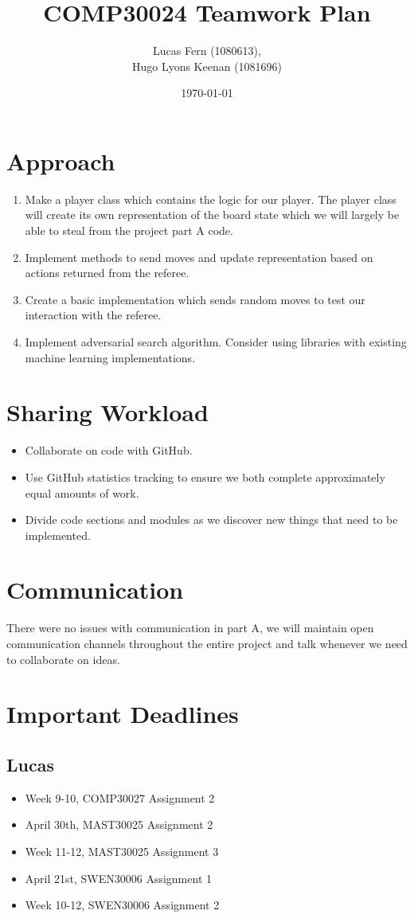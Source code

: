 \documentclass{article}
\title{COMP30024 Teamwork Plan}
\date{\today}
\author{Lucas Fern (1080613),\\Hugo Lyons Keenan (1081696)}
\begin{document}
\maketitle
\section{Approach}
\begin{enumerate}
    \item Make a player class which contains the logic for our player. The player class will create its own representation of the board state which we will largely be able to steal from the project part A code.
    \item Implement methods to send moves and update representation based on actions returned from the referee.
    \item Create a basic implementation which sends random moves to test our interaction with the referee.
    \item Implement adversarial search algorithm. Consider using libraries with existing machine learning implementations.
\end{enumerate}

\section{Sharing Workload}
\begin{itemize}
    \item Collaborate on code with GitHub.
    \item Use GitHub statistics tracking to ensure we both complete approximately equal amounts of work.
    \item Divide code sections and modules as we discover new things that need to be implemented.
\end{itemize}

\section{Communication}
There were no issues with communication in part A, we will maintain open communication channels throughout the entire project and talk whenever we need to collaborate on ideas.

\section{Important Deadlines}
\subsection{Lucas}
\begin{itemize}
    \item Week 9-10, COMP30027 Assignment 2
    \item April 30th, MAST30025 Assignment 2
    \item Week 11-12, MAST30025 Assignment 3
    \item April 21st, SWEN30006 Assignment 1
    \item Week 10-12, SWEN30006 Assignment 2
\end{itemize}
\end{document}
